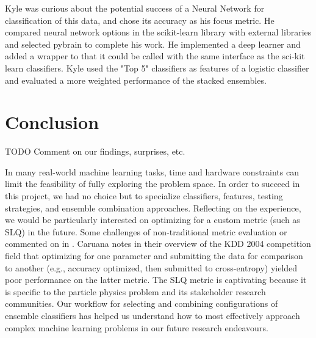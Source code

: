 \documentclass{article}
\begin{document}
Kyle was curious about the potential success of a Neural Network for classification of this data, and chose its accuracy as his focus metric. 
He compared neural network options in the scikit-learn library with external libraries and selected pybrain to complete his work.
He implemented a deep learner and added a wrapper to that it could be called with the same interface as the sci-kit learn classifiers.
Kyle used the "Top 5" classifiers as features of a logistic classifier and evaluated a more weighted performance of the stacked ensembles.


\section{Conclusion}

TODO Comment on our findings, surprises, etc.

In many real-world machine learning tasks, time and hardware constraints can limit the feasibility of fully exploring the problem space.
In order to succeed in this project, we had no choice but to specialize classifiers, features, testing strategies, and ensemble combination approaches.
Reflecting on the experience, we would be particularly interested on optimizing for a custom metric (such as SLQ) in the future.
Some challenges of non-traditional metric evaluation or commented on in \cite{vogel2004anti}.
Caruana notes in their overview of the KDD 2004 competition field \cite{caruana2004kdd} that optimizing for one parameter and submitting the data for comparison to another (e.g., accuracy optimized, then submitted to cross-entropy) yielded poor performance on the latter metric. 
The SLQ metric is captivating because it is specific to the particle physics problem and its stakeholder research communities. 
Our workflow for selecting and combining configurations of ensemble classifiers has helped us understand how to most effectively approach complex machine learning problems in our future research endeavours.




\end{document}

